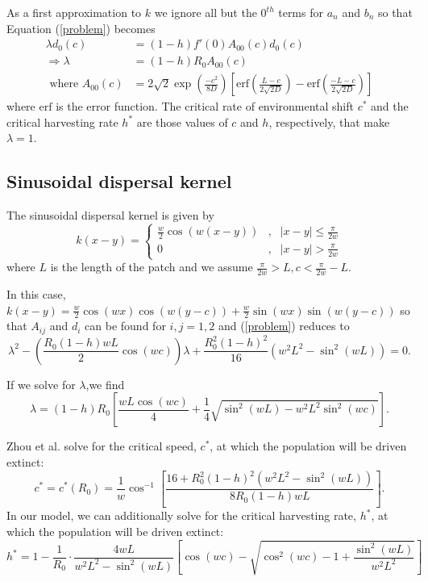 \documentclass[12pt,english]{article}
\begin{document}
As a first approximation to $k$ we ignore all but the $0^{th}$ terms for $a_n$ and $b_n$ so that Equation (\ref{problem}) becomes
\begin{align*}
\lambda d_0(c)&=(1-h)f'(0)A_{00}(c)d_0(c)
\\ \Rightarrow \lambda&=(1-h)R_0A_{00}(c)
\\\text{ where } A_{00}(c)&=2\sqrt{2}\exp\left(\frac{-c^2}{8D}\right)\left[\text{erf}\left(\frac{L-c}{2\sqrt{2D}}\right)-\text{erf}\left(\frac{-L-c}{2\sqrt{2D}}\right)\right]
\end{align*}
where $\text{erf}$ is the error function.  The critical rate of environmental shift $c^*$ and the critical harvesting rate $h^*$ are those values of $c$ and $h$, respectively, that make $\lambda=1$.

\subsection{Sinusoidal dispersal kernel \label{sinapp}}
The sinusoidal dispersal kernel is given by 
$$k(x-y)=\left\{\begin{array}{ccccc}
\frac{w}{2}\cos(w(x-y)) & , & |x-y|\leq\frac{\pi}{2w}
\\ 0 & , & |x-y|>\frac{\pi}{2w}
\end{array}\right.
$$
where $L$ is the length of the patch and we assume $\frac{\pi}{2w}>L,c<\frac{\pi}{2w}-L$.

In this case, $k(x-y)=\frac{w}{2}\cos(wx)\cos(w(y-c))+\frac{w}{2}\sin(wx)\sin(w(y-c))$ so that $A_{ij}$ and $d_i$ can be found for $i,j=1,2$ and (\ref{problem}) reduces to 
$$\lambda^2-\left(\frac{R_0(1-h)wL}{2}\cos(wc)\right)\lambda+\frac{R_0^2(1-h)^2}{16}\left(w^2L^2-\sin^2(wL)\right)=0.$$

If we solve for $\lambda$,we find
\begin{equation*} \lambda=(1-h)R_0\left[\frac{wL\cos(wc)}{4}+\frac{1}{4}\sqrt{\sin^2(wL)-w^2L^2\sin^2(wc)}\right]. \label{cosine} \end{equation*}


Zhou et al. \citep{ZhouKot2011} solve for the critical speed, $c^*$, at which the population will be driven extinct:
$$c^*=c^*(R_0)=\frac{1}{w}\cos^{-1}\left[\frac{16+R_0^2(1-h)^2(w^2L^2-\sin^2(wL))}{8R_0(1-h)wL}\right].$$
In our model, we can additionally solve for the critical harvesting rate, $h^*$, at which the population will be driven extinct:
$$
h^*=1-\frac{1}{R_0}\cdot\frac{4wL}{w^2L^2-\sin^2(wL)}\left[\cos(wc)-\sqrt{\cos^2(wc)-1+\frac{\sin^2(wL)}{w^2L^2}}\right] 
$$
\end{document}
